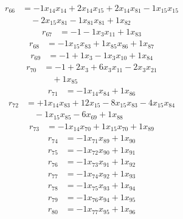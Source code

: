 \[\begin{aligned}
r_{66} &= - 1 x_{14} x_{14} + 2 x_{14} x_{15} + 2 x_{14} x_{81} - 1 x_{15} x_{15} \\
 &\quad - 2 x_{15} x_{81} - 1 x_{81} x_{81} + 1 x_{82}
\end{aligned}\]
\[\begin{aligned}
r_{67} &= - 1 - 1 x_{3} x_{11} + 1 x_{83}
\end{aligned}\]
\[\begin{aligned}
r_{68} &= - 1 x_{15} x_{83} + 1 x_{85} x_{86} + 1 x_{87}
\end{aligned}\]
\[\begin{aligned}
r_{69} &= - 1 + 1 x_{3} - 1 x_{3} x_{10} + 1 x_{84}
\end{aligned}\]
\[\begin{aligned}
r_{70} &= - 1 + 2 x_{3} + 6 x_{3} x_{11} - 2 x_{3} x_{21} \\
 &\quad + 1 x_{85}
\end{aligned}\]
\[\begin{aligned}
r_{71} &= - 1 x_{14} x_{84} + 1 x_{86}
\end{aligned}\]
\[\begin{aligned}
r_{72} &= + 1 x_{14} x_{83} + 12 x_{15} - 8 x_{15} x_{83} - 4 x_{15} x_{84} \\
 &\quad - 1 x_{15} x_{85} - 6 x_{69} + 1 x_{88}
\end{aligned}\]
\[\begin{aligned}
r_{73} &= - 1 x_{14} x_{70} + 1 x_{15} x_{70} + 1 x_{89}
\end{aligned}\]
\[\begin{aligned}
r_{74} &= - 1 x_{71} x_{89} + 1 x_{90}
\end{aligned}\]
\[\begin{aligned}
r_{75} &= - 1 x_{72} x_{90} + 1 x_{91}
\end{aligned}\]
\[\begin{aligned}
r_{76} &= - 1 x_{73} x_{91} + 1 x_{92}
\end{aligned}\]
\[\begin{aligned}
r_{77} &= - 1 x_{74} x_{92} + 1 x_{93}
\end{aligned}\]
\[\begin{aligned}
r_{78} &= - 1 x_{75} x_{93} + 1 x_{94}
\end{aligned}\]
\[\begin{aligned}
r_{79} &= - 1 x_{76} x_{94} + 1 x_{95}
\end{aligned}\]
\[\begin{aligned}
r_{80} &= - 1 x_{77} x_{95} + 1 x_{96}
\end{aligned}\]
